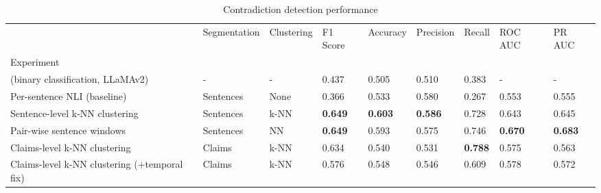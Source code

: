 \begin{table}
\caption{Contradiction detection performance}
\label{tab:all_results}
\begin{tabular}{lllllllll}
\toprule
 & Segmentation & Clustering & F1 Score & Accuracy & Precision & Recall & ROC AUC & PR AUC \\
Experiment &  &  &  &  &  &  &  &  \\
\midrule
\cite{li2024contradocunderstandingselfcontradictionsdocuments} (binary classification, LLaMAv2) & - & - & 0.437 & 0.505 & 0.510 & 0.383 & - & - \\
Per-sentence NLI (baseline) & Sentences & None & 0.366 & 0.533 & 0.580 & 0.267 & 0.553 & 0.555 \\
Sentence-level k-NN clustering & Sentences & k-NN & \textbf{0.649} & \textbf{0.603} & \textbf{0.586} & 0.728 & 0.643 & 0.645 \\
Pair-wise sentence windows & Sentences & NN & \textbf{0.649} & 0.593 & 0.575 & 0.746 & \textbf{0.670} & \textbf{0.683} \\
Claims-level k-NN clustering & Claims & k-NN & 0.634 & 0.540 & 0.531 & \textbf{0.788} & 0.575 & 0.563 \\
Claims-level k-NN clustering (+temporal fix) & Claims & k-NN & 0.576 & 0.548 & 0.546 & 0.609 & 0.578 & 0.572 \\
\bottomrule
\end{tabular}
\end{table}
